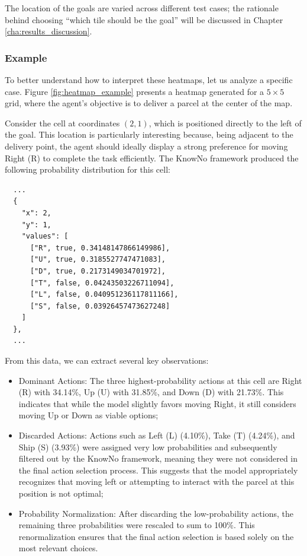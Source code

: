 The location of the goals are varied across different test cases; the rationale
behind choosing ``which tile should be the goal'' will be discussed in Chapter
\ref{cha:results_discussion}.

\subsubsection{Example}

To better understand how to interpret these heatmaps, let us analyze a specific
case. Figure \ref{fig:heatmap_example} presents a heatmap generated for a $5 \times
5$ grid, where the agent's objective is to deliver a parcel at the center of the
map.

Consider the cell at coordinates $(2,1)$, which is positioned directly to the left
of the goal. This location is particularly interesting because, being adjacent to
the delivery point, the agent should ideally display a strong preference for
moving Right (R) to complete the task efficiently. The KnowNo framework produced
the following probability distribution for this cell:

\begin{verbatim}
  ...
  {
    "x": 2,
    "y": 1,
    "values": [
      ["R", true, 0.34148147866149986],
      ["U", true, 0.3185527747471083],
      ["D", true, 0.2173149034701972],
      ["T", false, 0.04243503226711094],
      ["L", false, 0.040951236117811166],
      ["S", false, 0.03926457473627248]
    ]
  },
  ...
\end{verbatim}

From this data, we can extract several key observations:
\begin{itemize}
  \item Dominant Actions: The three highest-probability actions at this cell are
    Right (R) with 34.14\%, Up (U) with 31.85\%, and Down (D) with 21.73\%. This
    indicates that while the model slightly favors moving Right, it still considers
    moving Up or Down as viable options;

  \item Discarded Actions: Actions such as Left (L) (4.10\%), Take (T) (4.24\%),
    and Ship (S) (3.93\%) were assigned very low probabilities and subsequently filtered
    out by the KnowNo framework, meaning they were not considered in the final
    action selection process. This suggests that the model appropriately recognizes
    that moving left or attempting to interact with the parcel at this position is
    not optimal;

  \item Probability Normalization: After discarding the low-probability actions,
    the remaining three probabilities were rescaled to sum to 100\%. This renormalization
    ensures that the final action selection is based solely on the most relevant
    choices.
\end{itemize}


